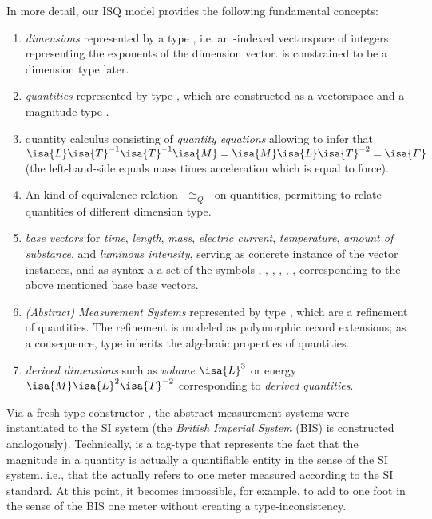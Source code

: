 \documentclass[11pt,a4paper]{book}
\begin{document}
In more detail, our ISQ model provides the following fundamental concepts:
%
\begin{enumerate}%
\item \emph{dimensions} represented by a type  , i.e. an -indexed
      vectorspace of integers representing the exponents of the dimension vector. 
       is constrained to be a dimension type later.


\item \emph{quantities} represented by type , which are constructed as 
      a  vectorspace and a magnitude type . 

\item{quantity calculus} consisting of \emph{quantity equations} allowing to infer that 
      $\isa{L}\isa{T}^{-1}\isa{T}^{-1}\isa{M} = \isa{M}\isa{L}\isa{T}^{-2} = \isa{F} $ 
      (the left-hand-side equals mass times acceleration which is equal to force). 

\item An kind of equivalence relation $\_\cong_{Q}\_$ on quantities, permitting to relate
      quantities of different dimension type.


\item \emph{base vectors} for
      \emph{time}, \emph{length}, \emph{mass}, \emph{electric current},
      \emph{temperature}, \emph{amount of substance}, and \emph{luminous intensity}, 
      serving as concrete instance of the vector instances, and as syntax a
      a set of the symbols  , , , ,  
      \isa{{\isasymTheta}}, ,   corresponding to the above mentioned base 
      base vectors.

\item \emph{(Abstract) Measurement Systems} represented by type 
      , which are a refinement
      of quantities. The refinement is modeled as polymorphic record extensions; as a 
      consequence, type inherits the algebraic properties of quantities.
 

\item \emph{derived dimensions} such as \emph{volume} $\isa{L}^3$ or energy 
      $\isa{M}\isa{L}^2\isa{T}^{-2}$ corresponding to \emph{derived quantities}.

\end{enumerate}

Via a fresh type-constructor , the abstract measurement systems were instantiated
to the SI system (the \emph{British Imperial System} (BIS) is constructed analogously).
Technically,  is a tag-type that represents the fact that the magnitude in a quantity is
actually a quantifiable entity in the sense of the SI system, i.e., that the  actually 
refers to one meter measured according to the SI standard. At this point, it becomes impossible,
for example, to add to one foot in the sense of the BIS one meter without creating a 
type-inconsistency.
\end{document}
